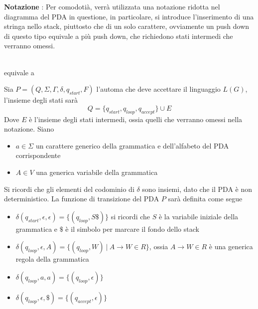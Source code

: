 \documentclass[10pt, letterpaper]{report}
\begin{document}
\textbf{Notazione} : Per comodotià, verrà utilizzata una notazione ridotta nel diagramma del PDA in questione, 
in particolare, si introduce l'inserimento di una stringa nello stack, piuttosto che di un solo carattere, ovviamente 
un push down di questo tipo equivale a più push down, che richiedono stati intermedi che verranno omessi.
\begin{center}
    \\equivale a\acc
\end{center}
Sia $P=(Q,\Sigma,\Gamma,\delta,q_{start},F)$ l'automa che deve accettare il linguaggio $L(G)$, l'insieme 
degli stati sarà 
$$ Q=\{q_{start},q_{loop},q_{accept}\}\cup E$$
Dove $E$ è l'insieme degli stati intermedi, ossia quelli che verranno omessi nella notazione.
Siano\begin{itemize}
    \item $a\in \Sigma$ un carattere generico della grammatica e dell'alfabeto del PDA corrispondente
    \item $A\in V$ una generica variabile della grammatica 
\end{itemize}
Si ricordi che gli elementi del codominio di $\delta$ sono insiemi, dato che il 
PDA è non deterministico. La funzione di transizione del PDA $P$ sarà definita come segue\begin{itemize}
    \item $\delta(q_{start},\epsilon,\epsilon)=\{(q_{loop},S\$)\}$ si ricordi che $S$ è la variabile iniziale 
    della grammatica e $\$$ è il simbolo per marcare il fondo dello stack
    \item $\delta(q_{loop},\epsilon,A)=\{(q_{loop},W)\ |\ A\rightarrow W \in R\}$, ossia  
    $A\longrightarrow W \in R$ è una generica regola della grammatica 
    \item $\delta(q_{loop},a,a)=\{(q_{loop},\epsilon)\}$
    \item $\delta(q_{loop},\epsilon,\$)=\{(q_{accept},\epsilon)\}$
\end{itemize}
\end{document}

